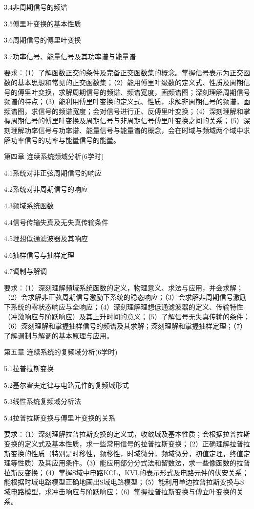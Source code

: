 \documentclass[letterpaper]{article}
\begin{document}
\quad\quad 3.4非周期信号的频谱\par
\quad\quad 3.5傅里叶变换的基本性质\par
\quad\quad 3.6周期信号的傅里叶变换\par
\quad\quad 3.7功率信号、能量信号及其功率谱与能量谱\par
\quad\quad 要求：（1）了解函数正交的条件及完备正交函数集的概念。掌握信号表示为正交函数的基本思想和常见的正交函数集；（2）能用傅里叶级数的定义式、性质及周期信号的傅里叶变换，求解周期信号的频谱、频谱宽度，画频谱图；深刻理解周期信号频谱的特点；（3）能利用傅里叶变换的定义式、性质，求解非周期信号的频谱，画频谱图，求信号的频谱宽度；会对信号进行正、反傅里叶变换；（4）深刻理解和掌握周期信号的傅里叶变换及周期信号与非周期信号傅里叶变换之间的关系；（5）深刻理解功率信号与功率谱、能量信号与能量谱的概念，会在时域与频域两个域中求解功率信号的功率与能量信号的能量。\par
\vspace{1em}
第四章 \quad\quad 连续系统频域分析(6学时)\par
\quad\quad 4.1系统对非正弦周期信号的响应\par
\quad\quad 4.2系统对非周期信号的响应\par
\quad\quad 4.3频域系统函数\par
\quad\quad 4.4信号传输失真及无失真传输条件\par
\quad\quad 4.5理想低通滤波器及其响应\par
\quad\quad 4.6抽样信号与抽样定理\par
\quad\quad 4.7调制与解调\par
\quad\quad 要求：（1）深刻理解频域系统函数的定义，物理意义、求法与应用，并会求解；（2）会求解非正弦周期信号激励下系统的稳态响应；（3）会求解非周期信号激励下系统的零状态响应与全响应；（4）深刻理解理想低通滤波器的定义、传输特性（冲激响应与阶跃响应）及其上升时间的意义；（5）了解信号无失真传输的条件；（6）深刻理解和掌握抽样信号的频谱及其求解；深刻理解和掌握抽样定理；（7）了解调制与解调的基本原理与应用。\par
\vspace{1em}
第五章 \quad 连续系统的复频域分析(6学时)\par
\quad\quad 5.1拉普拉斯变换\par
\quad\quad 5.2基尔霍夫定律与电路元件的复频域形式\par
\quad\quad 5.3线性系统复频域分析法\par
\quad\quad 5.4拉普拉斯变换与傅里叶变换的关系\par
\quad\quad 要求：（1）深刻理解拉普拉斯变换的定义式，收敛域及基本性质；会根据拉普拉斯变换的定义式及基本性质，求一些常用信号的拉普拉斯变换；（2）正确理解拉普拉斯变换的性质（特别是时移性，频移性，时域微分，频域微分，初值定理，终值定理等性质）及其应用条件。（3）能应用部分分式法和留数法，求一些像函数的拉普拉斯反变换；（4）掌握S域中电路KCL，KVL的表示形式及电路元件的伏安关系；能根据时域电路模型正确地画出S域电路模型；（5）能利用单边拉普拉斯变换与S域电路模型，求冲击响应与阶跃响应；（6）掌握拉普拉斯变换与傅立叶变换的关系。\par
\end{document}
